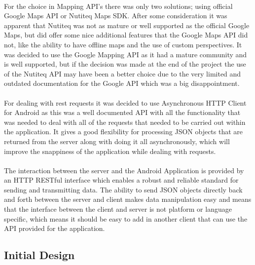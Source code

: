 \\
For the choice in Mapping API's there was only two solutions; using official Google Maps API or Nutiteq Maps SDK. After some consideration it was apparent that Nutiteq was not as mature or well supported as the official Google Maps, but did offer some nice additional features that the Google Maps API did not, like the ability to have offline maps and the use of custom perspectives. It was decided to use the Google Mapping API as it had a mature community and is well supported, but if the decision was made at the end of the project the use of the Nutiteq API may have been a better choice due to the very limited and outdated documentation for the Google API which was a big disappointment.\\
\\
For dealing with rest requests it was decided to use Asynchronous HTTP Client for Android \cite{nknj:AndroidAsynchronousHttpClientloopjandthePersistentCookieStore:2013:online} as this was a well documented API with all the functionality that was needed to deal with all of the requests that needed to be carried out within the application. It gives a good flexibility for processing JSON objects that are returned from the server along with doing it all asynchronously, which will improve the snappiness of the application while dealing with requests.\\
\\
The interaction between the server and the Android Application is provided by an HTTP RESTful interface which enables a robust and reliable standard for sending and transmitting data. The ability to send JSON objects directly back and forth between the server and client makes data manipulation easy and means that the interface between the client and server is not platform or language specific, which means it should be easy to add in another client that can use the API provided for the application.

\subsection{Initial Design}

